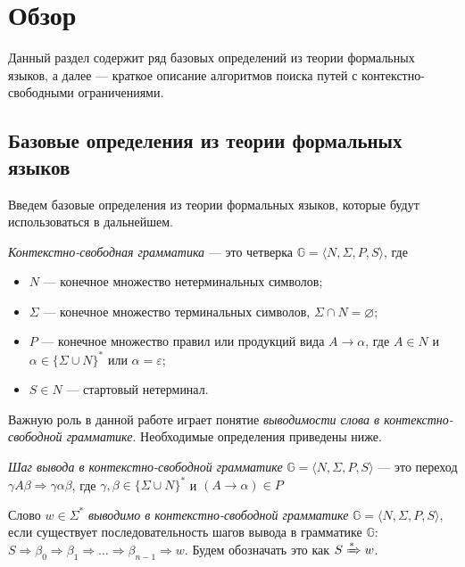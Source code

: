 \section{Обзор}

Данный раздел содержит ряд базовых определений из теории формальных языков, а далее --- краткое описание алгоритмов поиска путей с контекстно-свободными ограничениями.

\subsection{Базовые определения из теории формальных языков}
Введем базовые определения из теории формальных языков, которые будут использоваться в дальнейшем.

\begin{rudefinition}
     \emph{Контекстно-свободная грамматика} --- это четверка $\mathbb{G} = \langle N, \Sigma, P, S \rangle $, где
     \begin{itemize}
          \item $N$ --- конечное множество нетерминальных символов;
          \item $\Sigma$ --- конечное множество терминальных символов, $ \Sigma \cap N = \varnothing $;
          \item $P$ --- конечное множество правил или продукций вида $A \rightarrow \alpha$, где $A \in N$ и $\alpha  \in \{ \Sigma \cup N \}^*$ или $\alpha = \varepsilon$;
          \item $S \in N$ --- стартовый нетерминал.
     \end{itemize}
\end{rudefinition}

Важную роль в данной работе играет понятие \emph{выводимости слова в контекстно-свободной грамматике}.
Необходимые определения приведены ниже.

\begin{rudefinition}
    \emph{Шаг вывода в контекстно-свободной грамматике} $\mathbb{G} = \langle N, \Sigma, P, S \rangle$ --- это переход $\gamma A \beta \Rightarrow \gamma \alpha \beta$, где $\gamma, \beta \in \{ \Sigma \cup N \}^*$ и $(A \rightarrow \alpha) \in P$
\end{rudefinition}

\begin{rudefinition}
    Слово $w \in \Sigma^*$ \emph{выводимо в контекстно-свободной грамматике} $\mathbb{G} = \langle N, \Sigma, P, S \rangle$, если существует последовательность шагов вывода в грамматике $\mathbb{G}$: $S \Rightarrow \beta_0 \Rightarrow \beta_1 \Rightarrow \dots \Rightarrow \beta_{n - 1} \Rightarrow w$.
    Будем обозначать это как $S \xRightarrow[]{*} w$.
\end{rudefinition}

